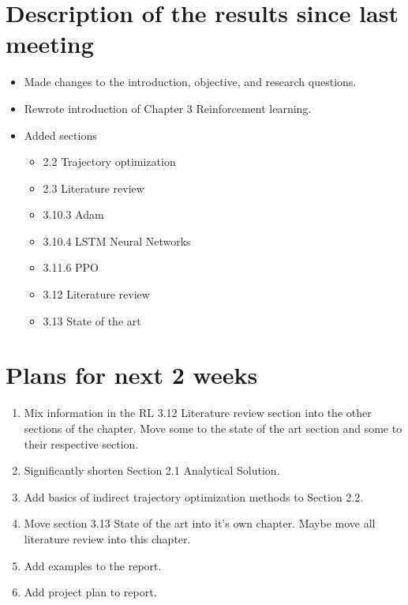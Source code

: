 \documentclass[a4paper,11pt]{article}
\begin{document}
	\section*{Description of the results since last meeting}
	\begin{itemize}
		\item Made changes to the introduction, objective, and research questions.
		\item Rewrote introduction of Chapter 3 Reinforcement learning.
		\item Added sections
			\begin{itemize}
				\item 2.2 Trajectory optimization
				\item 2.3 Literature review
				\item 3.10.3 Adam
				\item 3.10.4 LSTM Neural Networks
				\item 3.11.6 PPO
				\item 3.12 Literature review
				\item 3.13 State of the art
			\end{itemize}
	\end{itemize}
	
	\section*{Plans for next 2 weeks}
	\begin{enumerate}
		\item Mix information in the RL 3.12 Literature review section into the other sections of the chapter. Move some to the state of the art section and some to their respective section.
		\item Significantly shorten Section  2.1 Analytical Solution.
		\item Add basics of indirect trajectory optimization methods to Section 2.2.
		\item Move section 3.13 State of the art into it's own chapter. Maybe move all literature review into this chapter.
		\item Add examples to the report.
		\item Add project plan to report.
	\end{enumerate}
	
\end{document}

